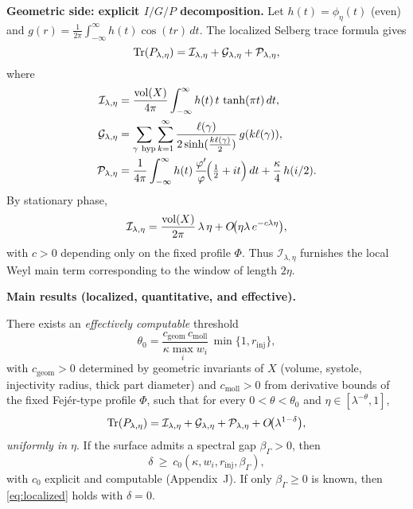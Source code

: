 \medskip
\noindent\textbf{Geometric side: explicit $I/G/P$ decomposition.}
Let $h(t)=\phi_\eta(t)$ (even) and $g(r)=\frac{1}{2\pi}\int_{-\infty}^{\infty}h(t)\cos(tr)\,dt$. The localized Selberg trace formula gives
\begin{equation}\label{eq:IGP}
\operatorname{Tr}(P_{\lambda,\eta}) = \mathcal{I}_{\lambda,\eta}+\mathcal{G}_{\lambda,\eta}+\mathcal{P}_{\lambda,\eta},
\end{equation}
where
\begin{align}
\mathcal{I}_{\lambda,\eta} &= \frac{\vol(X)}{4\pi}\int_{-\infty}^{\infty} h(t)\,t\,\tanh(\pi t)\,dt, \label{eq:I}\\
\mathcal{G}_{\lambda,\eta} &= \sum_{\gamma\ \mathrm{hyp}}\sum_{k=1}^{\infty} 
\frac{\ell(\gamma)}{2\sinh(\tfrac{k\ell(\gamma)}{2})}\, g(k\ell(\gamma)), \label{eq:G}\\
\mathcal{P}_{\lambda,\eta} &= \frac{1}{4\pi}\int_{-\infty}^{\infty} h(t)\,\frac{\varphi'}{\varphi}\!\Big(\tfrac12+it\Big)\,dt + \frac{\kappa}{4}\,h(i/2).\label{eq:P}
\end{align}
By stationary phase,
\begin{equation}\label{eq:weyl-main}
\mathcal{I}_{\lambda,\eta} = \frac{\operatorname{vol}(X)}{2\pi}\,\lambda\,\eta + O\!\big(\eta\lambda\,e^{-c\lambda\eta}\big),
\end{equation}
with $c>0$ depending only on the fixed profile $\Phi$. Thus $\mathcal{I}_{\lambda,\eta}$ furnishes the local Weyl main term corresponding to the window of length $2\eta$.

\medskip
\noindent\textbf{Main results (localized, quantitative, and effective).}
\begin{theorem}\label{thm:localized}
There exists an \emph{effectively computable} threshold
\[
\theta_0=\frac{c_{\mathrm{geom}}\,c_{\mathrm{moll}}}{\kappa\max_i w_i}\,\min\{1,r_{\mathrm{inj}}\},
\]
with $c_{\mathrm{geom}}>0$ determined by geometric invariants of $X$ (volume, systole, injectivity radius, thick part diameter) and $c_{\mathrm{moll}}>0$ from derivative bounds of the fixed Fejér-type profile $\Phi$, such that for every $0<\theta<\theta_0$ and $\eta\in[\lambda^{-\theta},1]$,
\begin{equation}\label{eq:localized}
\operatorname{Tr}(P_{\lambda,\eta}) = \mathcal{I}_{\lambda,\eta}+\mathcal{G}_{\lambda,\eta}+\mathcal{P}_{\lambda,\eta} + O\!\big(\lambda^{1-\delta}\big),
\end{equation}
\emph{uniformly in $\eta$}. If the surface admits a spectral gap $\beta_\Gamma>0$, then
\begin{equation}\label{eq:delta-gap}
\delta\ \ge\ c_0(\kappa,{w_i},r_{\mathrm{inj}},\beta_\Gamma),
\end{equation}
with $c_0$ explicit and computable (Appendix~J). If only $\beta_\Gamma\ge0$ is known, then \eqref{eq:localized} holds with $\delta=0$.
\end{theorem}

